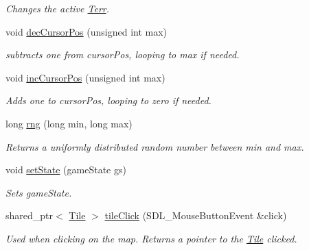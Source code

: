 \begin{DoxyCompactItemize}
\begin{DoxyCompactList}\small\item\em Changes the active \hyperlink{class_terr}{Terr}. \end{DoxyCompactList}\item 
void \hyperlink{class_game_state_ab0ecc413fbf4772869e037bc3489f26e}{dec\+Cursor\+Pos} (unsigned int max)\hypertarget{class_game_state_ab0ecc413fbf4772869e037bc3489f26e}{}\label{class_game_state_ab0ecc413fbf4772869e037bc3489f26e}

\begin{DoxyCompactList}\small\item\em subtracts one from cursor\+Pos, looping to max if needed. \end{DoxyCompactList}\item 
void \hyperlink{class_game_state_a1f40f501f25ae4ea245a6e3011ac85fd}{inc\+Cursor\+Pos} (unsigned int max)\hypertarget{class_game_state_a1f40f501f25ae4ea245a6e3011ac85fd}{}\label{class_game_state_a1f40f501f25ae4ea245a6e3011ac85fd}

\begin{DoxyCompactList}\small\item\em Adds one to cursor\+Pos, looping to zero if needed. \end{DoxyCompactList}\item 
long \hyperlink{class_game_state_a64caafde825c0fc890e41d24d12c3927}{rng} (long min, long max)\hypertarget{class_game_state_a64caafde825c0fc890e41d24d12c3927}{}\label{class_game_state_a64caafde825c0fc890e41d24d12c3927}

\begin{DoxyCompactList}\small\item\em Returns a uniformly distributed random number between min and max. \end{DoxyCompactList}\item 
void \hyperlink{class_game_state_af81371645645ecd84d5d2a246e97d14d}{set\+State} (game\+State gs)\hypertarget{class_game_state_af81371645645ecd84d5d2a246e97d14d}{}\label{class_game_state_af81371645645ecd84d5d2a246e97d14d}

\begin{DoxyCompactList}\small\item\em Sets game\+State. \end{DoxyCompactList}\item 
shared\+\_\+ptr$<$ \hyperlink{class_tile}{Tile} $>$ \hyperlink{class_game_state_a12e67e467e0c1be59d5b681b95e33120}{tile\+Click} (S\+D\+L\+\_\+\+Mouse\+Button\+Event \&click)\hypertarget{class_game_state_a12e67e467e0c1be59d5b681b95e33120}{}\label{class_game_state_a12e67e467e0c1be59d5b681b95e33120}

\begin{DoxyCompactList}\small\item\em Used when clicking on the map. Returns a pointer to the \hyperlink{class_tile}{Tile} clicked. \end{DoxyCompactList}\end{DoxyCompactItemize}
